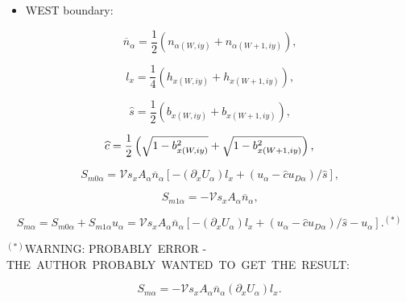 \documentclass[11pt]{article}
\begin{document}
\bigskip

\begin{itemize}
\item  WEST boundary:
\end{itemize}

\begin{equation}
\overline{n}_{\alpha}=\frac{1}{2}\left( n_{\alpha\left( W,iy\right)
}+n_{\alpha\left( W+1,iy\right) }\right) \text{,}   \label{c93}
\end{equation}

\begin{equation}
l_{x}=\frac{1}{4}\left( h_{x\left( W,iy\right) }+h_{x\left( W+1,iy\right)
}\right) \text{,}   \label{c94}
\end{equation}

\begin{equation}
\widehat{s}=\frac{1}{2}\left( b_{x\left( W,iy\right) }+b_{x\left(
W+1,iy\right) }\right) \text{,}   \label{c95}
\end{equation}

\begin{equation}
\widehat{c}=\frac{1}{2}\left( \sqrt{1-b_{x\left( W,iy\right) }^{2}}+\sqrt{%
1-b_{x\left( W+1,iy\right) }^{2}}\right) \text{,}   \label{c96}
\end{equation}

\begin{equation}
S_{m0\alpha}=\mathcal{V}s_{x}A_{\alpha}\overline{n}_{\alpha}\left[ -\left(
\partial_{x}U_{\alpha}\right) l_{x}+\left( u_{\alpha}-\widehat{c}u_{D\alpha
}\right) /\widehat{s}\right] \text{,}   \label{c97}
\end{equation}

\begin{equation}
S_{m1\alpha}=-\mathcal{V}s_{x}A_{\alpha}\overline{n}_{\alpha}\text{,} 
\label{c98}
\end{equation}

\begin{equation}
S_{m\alpha}=S_{m0\alpha}+S_{m1\alpha}u_{\alpha}=\mathcal{V}s_{x}A_{\alpha }%
\overline{n}_{\alpha}\left[ -\left( \partial_{x}U_{\alpha}\right)
l_{x}+\left( u_{\alpha}-\widehat{c}u_{D\alpha}\right) /\widehat{s}-u_{\alpha}%
\right] \text{.}^{\left( \ast\right) }   \label{c99}
\end{equation}

\bigskip

$^{\left( \ast\right) }$WARNING: PROBABLY\ ERROR - THE\ AUTHOR\ PROBABLY\
WANTED\ TO\ GET\ THE\ RESULT:

\begin{equation*}
S_{m\alpha}=-\mathcal{V}s_{x}A_{\alpha}\overline{n}_{\alpha}\left(
\partial_{x}U_{\alpha}\right) l_{x}\text{.}
\end{equation*}
\end{document}
